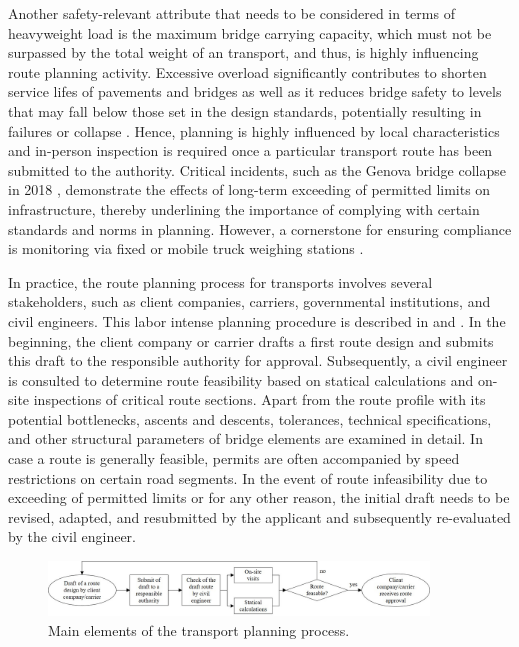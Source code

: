 Another safety-relevant attribute that needs to be considered in terms of heavyweight load is the maximum bridge carrying capacity, which must not be surpassed by the total weight of an \ohc transport, and thus, is highly influencing route planning activity.
Excessive overload significantly contributes to shorten service lifes of pavements and bridges as well as it reduces bridge safety to levels that may fall below those set in the design standards, potentially resulting in failures or collapse \cite{fiorillo2018fragility, yan2018optimal, ghosn2000development, wu2019assessment, lou2016effect}. Hence, planning is highly influenced by local characteristics and in-person inspection is required once a particular transport route has been submitted to the authority.
Critical incidents, such as the Genova bridge collapse in 2018 \cite{Morgese.2020, MorandiNYTimes},  demonstrate the effects of long-term exceeding of permitted limits on infrastructure, thereby underlining the importance of complying with certain standards and norms in \ohc planning. However, a cornerstone for ensuring compliance is monitoring via fixed or mobile truck weighing stations \cite{fiorillo2016minimizing}.
\par In practice, the route planning process for \ohc transports involves several stakeholders, such as client companies, carriers, governmental institutions, and civil engineers.
This labor intense planning procedure is described in \cite{Osegueda.1999} and \cite{ray2007web}. In the beginning, the client company or carrier drafts a first route design and submits this draft to the responsible authority for approval.
Subsequently, a civil engineer is consulted to determine route feasibility based on statical calculations and on-site inspections of critical route sections. Apart from the route profile with its potential bottlenecks, ascents and descents, tolerances, technical specifications, and other structural parameters of bridge elements are examined in detail. In case a route is generally feasible, permits are often accompanied by speed restrictions on certain road segments. In the event of route infeasibility due to exceeding of permitted limits or for any other reason, the initial draft needs to be revised, adapted, and resubmitted by the applicant and subsequently re-evaluated by the civil engineer.


\begin{figure}[!ht]
  \centering
  \includegraphics[width=0.9\textwidth]{final.jpg}
  \caption{Main elements of the \ohc transport planning process.}
  \label{fig:higherlevel}
\end{figure}

